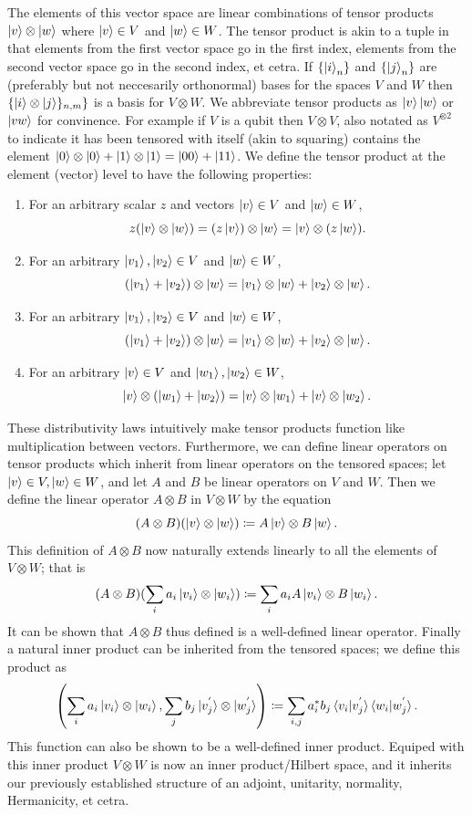 \documentclass[12pt,twoside]{reedthesis}
\theoremstyle{plain}   %
\theoremstyle{definition}
\theoremstyle{remark}
\numberwithin{equation}{section}
\begin{document}
  The elements of this vector space are linear combinations of tensor products $\ket{v} \otimes \ket{w}$
  where $\ket{v} \in V$ and $\ket{w} \in W$.
  The tensor product is akin to a tuple in that elements from the first vector space go in the first index, elements from the second vector space go in the second index, et cetra.
  If $\{\ket{i}_n \}$ and $\{\ket{j}_n \}$ are (preferably but not neccesarily orthonormal) bases for the spaces $V$ and $W$ then $\{ \ket{i} \otimes \ket{j} \}_{n, m}\}$ is a basis for $V \otimes W$.
  We abbreviate tensor products as $\ket{v} \ket{w}$ or $\ket{vw}$ for convinence.
  For example if $V$ is a qubit then $V \otimes V$, also notated as $V^{\otimes 2}$ to indicate it has been tensored with itself (akin to squaring) contains the element
  $\ket{0} \otimes \ket{0} + \ket{1} \otimes \ket{1} = \ket{0 0} + \ket{1 1}$.
  We define the tensor product at the element (vector) level to have the following properties:
  \begin{enumerate}
  \item For an arbitrary scalar $z$ and vectors $\ket{v} \in V$ and $\ket{w} \in W$,
    \[ z ( \ket{v} \otimes \ket{w}) = (z \ket{v}) \otimes \ket{w} = \ket{v} \otimes (z \ket{w }).\]

  \item
    For an arbitrary $\ket{v_1}, \ket{v_2} \in V$ and $\ket{w} \in W$,
    \[ (\ket{v_1} + \ket{v_2}) \otimes \ket{w} = \ket{v_1}  \otimes \ket{w} + \ket{v_2} \otimes \ket{w}. \]
  \item
    For an arbitrary $\ket{v_1}, \ket{v_2} \in V$ and $\ket{w} \in W$,
    \[ (\ket{v_1} + \ket{v_2}) \otimes \ket{w} = \ket{v_1}  \otimes \ket{w} + \ket{v_2} \otimes \ket{w}. \]
  \item
    For an arbitrary $\ket{v} \in V$ and $\ket{w_1}, \ket{w_2} \in W$,
    \[ \ket{v} \otimes (\ket{w_1} + \ket{w_2})  = \ket{v}  \otimes \ket{w_1} + \ket{v} \otimes \ket{w_2}. \]
  \end{enumerate}
  These distributivity laws intuitively make tensor products function like multiplication between vectors.
  Furthermore, we can define linear operators on tensor products which inherit from linear operators on the tensored spaces;
  let $\ket{v} \in V, \ket{w} \in W$, and let $A$ and $B$ be linear operators on $V$ and $W$.
  Then we define the linear operator $A \otimes B$ in $V \otimes W$ by the equation
  \[(A \otimes B) (\ket{v} \otimes \ket{w}) \coloneq A  \ket{v} \otimes B \ket{w}.\]
  This definition of $A \otimes B$ now naturally extends linearly to all the elements of $V \otimes W$; that is
  \[(A \otimes B) (\sum_i a_i \ket{v_i} \otimes \ket{w_i}) \coloneq \sum_i a_i A\ket{v_i} \otimes B\ket{w_i}.\]
  It can be shown that $A \otimes B$ thus defined is a well-defined linear operator.
  Finally a natural inner product can be inherited from the tensored spaces; we define this product as 
  \[ \left( \sum_i a_i \ket{v_i} \otimes \ket{w_i}, \sum_j b_j \ket{v^{'}_j} \otimes \ket{w^{'}_j}  \right) \coloneq
    \sum_{i, j} a_i^* b_j \braket{v_i  | v^{'}_j} \braket{w_i  | w^{'}_j}. \]
  This function can also be shown to be a well-defined inner product. Equiped with this inner product $V \otimes W$ is now an inner product/Hilbert space, and it inherits our previously established structure of
  an adjoint, unitarity, normality, Hermanicity, et cetra.
\end{document}
